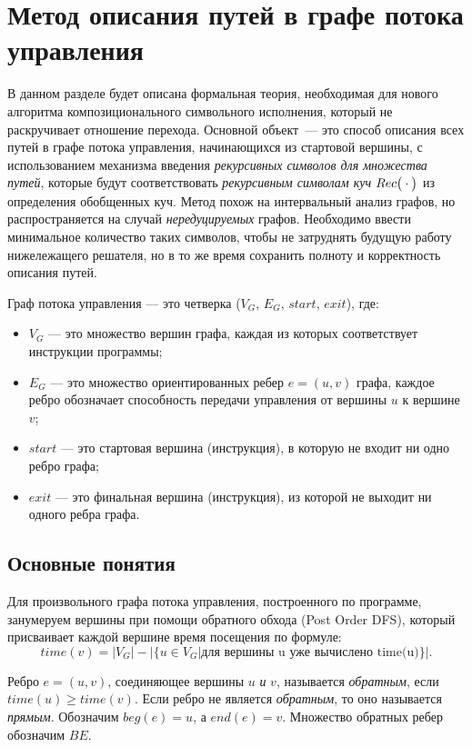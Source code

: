\section{Метод описания путей в графе потока управления}
В данном разделе будет описана формальная теория, необходимая для нового алгоритма композиционального символьного исполнения, который не раскручивает отношение перехода. Основной объект~--- это способ описания всех путей в графе потока управления, начинающихся из стартовой вершины, с использованием механизма введения \emph{рекурсивных символов для множества путей}, которые будут соответствовать \emph{рекурсивным символам куч} $Rec\big(\cdot\big)$ из определения обобщенных куч. Метод похож на интервальный анализ графов, но распространяется на случай \emph{нередуцируемых} графов.
Необходимо ввести минимальное количество таких символов, чтобы не затруднять будущую работу нижележащего решателя, но в то же время сохранить полноту и корректность описания путей.

\begin{defn}
Граф потока управления --- это четверка ($V_G$, $E_G$, $start$, $exit$), где:
\begin{itemize}
    \item $V_G$ --- это множество вершин графа, каждая из которых соответствует инструкции программы;
    \item $E_G$ --- это множество ориентированных ребер $e = (u, v)$ графа, каждое ребро обозначает способность передачи управления от вершины $u$ к вершине $v$;
    \item $start$ --- это стартовая вершина (инструкция), в которую не входит ни одно ребро графа;
    \item $exit$ --- это финальная вершина (инструкция), из которой не выходит ни одного ребра графа.
\end{itemize}
\end{defn}

\subsection{Основные понятия}
Для произвольного графа потока управления, построенного по программе,
занумеруем вершины при помощи обратного обхода (Post Order DFS), который присваивает каждой вершине время посещения по формуле:
$$time(v) = |V_G| - |\{u \in V_G| \mbox{для вершины u уже вычислено time(u)}\}|.$$

\begin{defn}\label{backEdges}
Ребро $e = (u,v)$, соединяющее вершины $u$ \emph{и} $v$, называется \emph{обратным}, если $time(u) \geq time(v)$. 
Если ребро не является \emph{обратным}, то оно называется \emph{прямым}.
Обозначим $beg(e) = u$, а $end(e) = v$.
Множество обратных ребер обозначим $BE$.
\end{defn}

